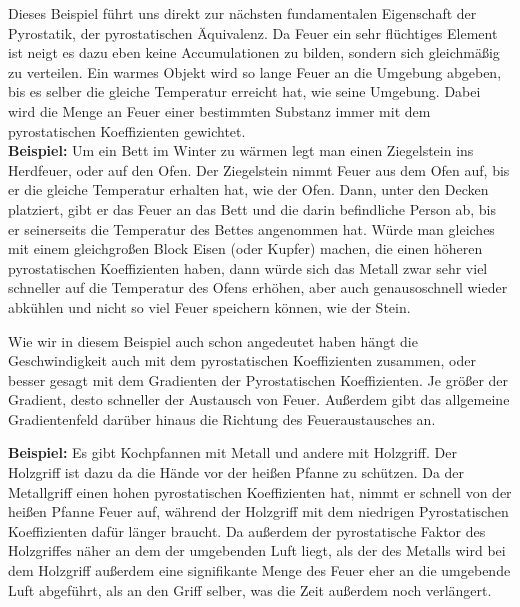 \documentclass[a5paper,8pt]{book}
\begin{document}



Dieses Beispiel führt uns direkt zur nächsten fundamentalen Eigenschaft der Pyrostatik, der pyrostatischen Äquivalenz. Da 
Feuer ein sehr flüchtiges Element ist neigt es dazu eben keine Accumulationen zu bilden, sondern sich gleichmäßig zu 
verteilen. Ein warmes Objekt wird so lange Feuer an die Umgebung abgeben, bis es selber die gleiche Temperatur erreicht 
hat, wie seine Umgebung. Dabei wird die Menge an Feuer einer bestimmten Substanz immer mit dem pyrostatischen Koeffizienten 
gewichtet.\\

\textbf{Beispiel:}
Um ein Bett im Winter zu wärmen legt man einen Ziegelstein ins Herdfeuer, oder auf den Ofen. Der Ziegelstein nimmt Feuer 
aus dem Ofen auf, bis er die gleiche Temperatur erhalten hat, wie der Ofen. Dann, unter den Decken platziert, gibt er das 
Feuer an das Bett und die darin befindliche Person ab, bis er seinerseits die Temperatur des Bettes angenommen hat.
Würde man gleiches mit einem gleichgroßen Block Eisen (oder Kupfer) machen, die einen höheren pyrostatischen Koeffizienten 
haben,  dann würde sich das Metall zwar sehr viel schneller auf die Temperatur des Ofens erhöhen, aber auch genausoschnell 
wieder abkühlen und nicht so viel Feuer speichern können, wie der Stein.

Wie wir in diesem Beispiel auch schon angedeutet haben hängt die Geschwindigkeit auch mit dem pyrostatischen Koeffizienten 
zusammen, oder besser gesagt mit dem Gradienten der Pyrostatischen Koeffizienten. Je größer der Gradient, desto schneller 
der Austausch von Feuer. Außerdem gibt das allgemeine Gradientenfeld darüber hinaus die Richtung des Feueraustausches an.

\textbf{Beispiel:}
Es gibt Kochpfannen mit Metall und andere mit Holzgriff. Der Holzgriff ist dazu da die Hände vor der heißen Pfanne zu 
schützen. Da der Metallgriff einen hohen pyrostatischen Koeffizienten hat, nimmt er schnell von der heißen Pfanne Feuer 
auf, während der Holzgriff mit dem niedrigen Pyrostatischen Koeffizienten dafür länger braucht.
Da außerdem der pyrostatische Faktor des Holzgriffes näher an dem der umgebenden Luft liegt, als der des Metalls wird 
bei dem Holzgriff außerdem eine signifikante Menge des Feuer eher an die umgebende Luft abgeführt, als an den Griff 
selber, was die Zeit außerdem noch verlängert.\footnotemark[4]\\
\end{document}
